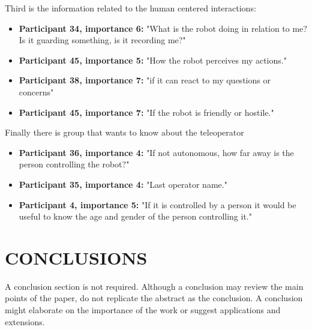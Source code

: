 \documentclass[letterpaper, 10 pt, conference]{ieeeconf}  %
\begin{document}
Third is the information related to the human centered interactions:
\begin{itemize}
    \item  \textbf{Participant 34, importance 6:} "What is the robot doing in relation to me? Is it guarding something, is it recording me?"
    \item  \textbf{Participant 45, importance 5:} "How the robot perceives my actions."
    \item  \textbf{Participant 38, importance 7:} "if it can react to my questions or concerns"
    \item  \textbf{Participant 45, importance 7:} "If the robot is friendly or hostile."
\end{itemize}

Finally there is group that wants to know about the teleoperator
\begin{itemize}
    \item  \textbf{Participant 36, importance 4:} "If not autonomous, how far away is the person controlling the robot?"
    \item  \textbf{Participant 35, importance 4:} "Last operator name."
    \item  \textbf{Participant 4, importance 5:} "If it is controlled by a person it would be useful to know the age and gender of the person controlling it."
\end{itemize}


\section{CONCLUSIONS}

A conclusion section is not required. Although a conclusion may review the main points of the paper, do not replicate the abstract as the conclusion. A conclusion might elaborate on the importance of the work or suggest applications and extensions. 

\addtolength{\textheight}{-12cm}   %

\end{document}
